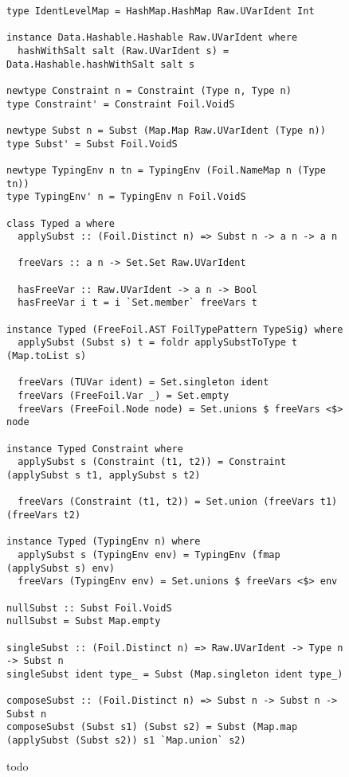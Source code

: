 \begin{figure}[H]
  \begin{verbatim}
type IdentLevelMap = HashMap.HashMap Raw.UVarIdent Int

instance Data.Hashable.Hashable Raw.UVarIdent where
  hashWithSalt salt (Raw.UVarIdent s) = Data.Hashable.hashWithSalt salt s

newtype Constraint n = Constraint (Type n, Type n)
type Constraint' = Constraint Foil.VoidS

newtype Subst n = Subst (Map.Map Raw.UVarIdent (Type n))
type Subst' = Subst Foil.VoidS

newtype TypingEnv n tn = TypingEnv (Foil.NameMap n (Type tn))
type TypingEnv' n = TypingEnv n Foil.VoidS

class Typed a where
  applySubst :: (Foil.Distinct n) => Subst n -> a n -> a n

  freeVars :: a n -> Set.Set Raw.UVarIdent

  hasFreeVar :: Raw.UVarIdent -> a n -> Bool
  hasFreeVar i t = i `Set.member` freeVars t

instance Typed (FreeFoil.AST FoilTypePattern TypeSig) where
  applySubst (Subst s) t = foldr applySubstToType t (Map.toList s)

  freeVars (TUVar ident) = Set.singleton ident
  freeVars (FreeFoil.Var _) = Set.empty
  freeVars (FreeFoil.Node node) = Set.unions $ freeVars <$> node

instance Typed Constraint where
  applySubst s (Constraint (t1, t2)) = Constraint (applySubst s t1, applySubst s t2)

  freeVars (Constraint (t1, t2)) = Set.union (freeVars t1) (freeVars t2)

instance Typed (TypingEnv n) where
  applySubst s (TypingEnv env) = TypingEnv (fmap (applySubst s) env)
  freeVars (TypingEnv env) = Set.unions $ freeVars <$> env

nullSubst :: Subst Foil.VoidS
nullSubst = Subst Map.empty

singleSubst :: (Foil.Distinct n) => Raw.UVarIdent -> Type n -> Subst n
singleSubst ident type_ = Subst (Map.singleton ident type_)

composeSubst :: (Foil.Distinct n) => Subst n -> Subst n -> Subst n
composeSubst (Subst s1) (Subst s2) = Subst (Map.map (applySubst (Subst s2)) s1 `Map.union` s2)
  \end{verbatim}
  \caption{todo}
\end{figure}

